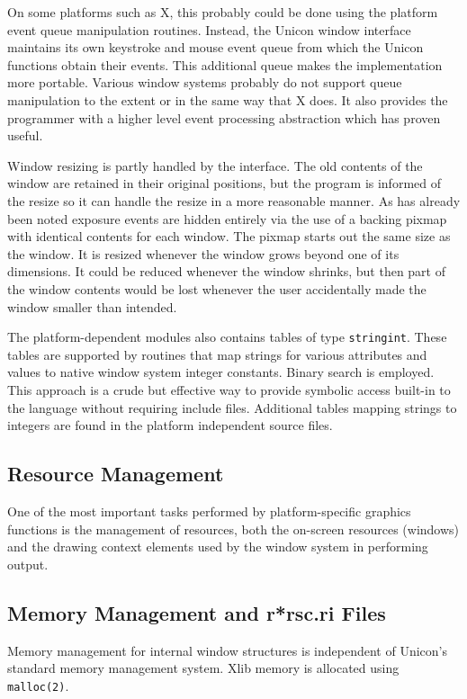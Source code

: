 On some platforms such as X, this probably could be done using the
platform event queue manipulation routines.  Instead, the Unicon
window interface maintains its own keystroke and mouse event queue
from which the Unicon functions obtain their events. This additional
queue makes the implementation more portable. Various window systems
probably do not support queue manipulation to the extent or in the
same way that X does. It also provides the programmer with a higher
level event processing abstraction which has proven useful.

Window resizing is partly handled by the interface. The old contents
of the window are retained in their original positions, but the
program is informed of the resize so it can handle the resize in a
more reasonable manner. As has already been noted exposure events are
hidden entirely via the use of a backing pixmap with identical
contents for each window. The pixmap starts out the same size as the
window. It is resized whenever the window grows beyond one of its
dimensions. It could be reduced whenever the window shrinks, but then
part of the window contents would be lost whenever the user
accidentally made the window smaller than intended.

The platform-dependent modules also contains tables of type
\texttt{stringint}. These tables are supported by routines that map
strings for various attributes and values to native window system
integer constants. Binary search is employed. This approach is a crude
but effective way to provide symbolic access
{\textquotedbl}built-in{\textquotedbl} to the language without
requiring include files. Additional tables mapping strings to
integers are found in the platform independent source files.

\subsection{Resource Management}

One of the most important tasks performed by platform-specific
graphics functions is the management of resources, both the on-screen
resources (windows) and the drawing context elements used by the
window system in performing output.

\subsection{Memory Management and r*rsc.ri Files}

Memory management for internal window structures is independent of
Unicon's standard memory management system. Xlib memory is allocated
using \texttt{malloc(2)}.

